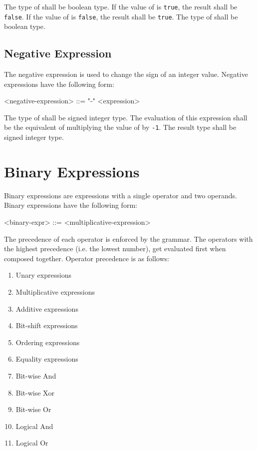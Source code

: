 The type of  shall be boolean type. If the value of  is \texttt{true}, the result shall be \texttt{false}. If the value of  is \texttt{false}, the result shall be \texttt{true}. The type of  shall be boolean type.

\subsection{Negative Expression} \label{neg_expr_guide}

The negative expression is used to change the sign of an integer value. Negative expressions have the following form:

\begin{minip}
\begin{grammar}
<negative-expression> ::= "-" <expression>
\end{grammar}
\end{minip}

The type of  shall be signed integer type. The evaluation of this expression shall be the equivalent of multiplying the value of  by \texttt{-1}. The result type shall be signed integer type.

\section{Binary Expressions} \label{binary_expr_guide}

Binary expressions are expressions with a single operator and two operands. Binary expressions have the following form:

\begin{minip}
\begin{grammar}
<binary-expr> ::= <multiplicative-expression>
\end{grammar}
\end{minip}

The precedence of each operator is enforced by the grammar. The operators with the highest precedence (i.e. the lowest number), get evaluated first when composed together. Operator precedence is as follows:

\begin{enumerate}
\singlespacing
\item Unary expressions
\item Multiplicative expressions
\item Additive expressions
\item Bit-shift expressions
\item Ordering expressions
\item Equality expressions
\item Bit-wise And
\item Bit-wise Xor
\item Bit-wise Or
\item Logical And
\item Logical Or
\end{enumerate}

